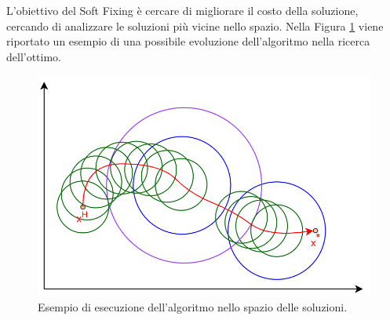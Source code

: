 L'obiettivo del Soft Fixing è cercare di migliorare il costo della soluzione, cercando di analizzare le soluzioni più vicine nello spazio. Nella Figura \ref{local_exe} viene riportato un esempio di una possibile evoluzione dell'algoritmo nella ricerca dell'ottimo.
\begin{figure}[H] 
\begin{center} 
  \includegraphics[scale=0.38]{Images/local_exe}
  \caption{\footnotesize{Esempio di esecuzione dell'algoritmo nello spazio delle soluzioni.}} \label{local_exe} 
\end{center} 
\end{figure}